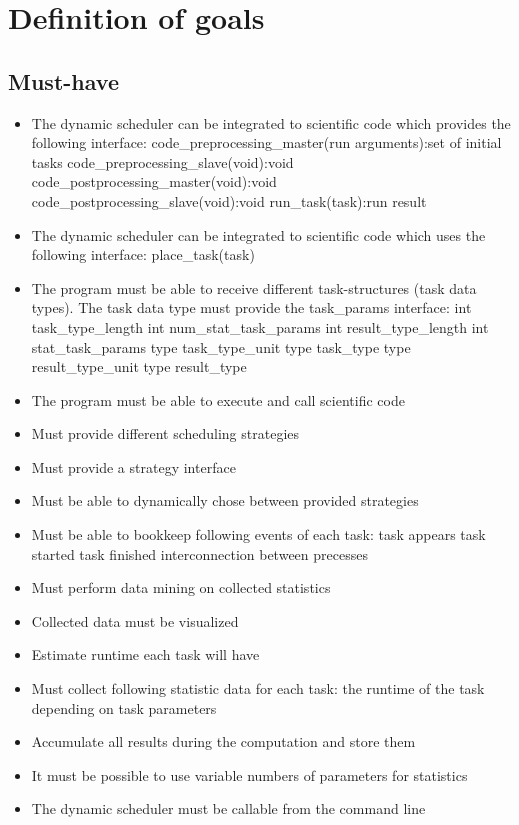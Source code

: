 \section{Definition of goals}
	\subsection{Must-have}
		\begin{itemize}
			\item The dynamic scheduler can be integrated to scientific code which provides the following interface:
				\subitem code\_preprocessing\_master(run arguments):set of initial tasks
				\subitem code\_preprocessing\_slave(void):void
				\subitem code\_postprocessing\_master(void):void
				\subitem code\_postprocessing\_slave(void):void
				\subitem run\_task(task):run result
			\item The dynamic scheduler can be integrated to scientific code which uses the following interface:
				\subitem place\_task(task)
			\item The program must be able to receive different task-structures (task data types). The task data type must provide the task\_params interface:
				\subitem int task\_type\_length
				\subitem int num\_stat\_task\_params
				\subitem int result\_type\_length
				\subitem int stat\_task\_params
				\subitem type task\_type\_unit
				\subitem type task\_type
				\subitem type result\_type\_unit
				\subitem type result\_type
				
			\item The program must be able to execute and call scientific code
			\item Must provide different scheduling strategies
			\item Must provide a strategy interface
			\item Must be able to dynamically chose between provided strategies
			\item Must be able to bookkeep following events of each task:
				\subitem task appears
				\subitem task started
				\subitem task finished
				\subitem interconnection between precesses
			\item Must perform data mining on collected statistics
			\item Collected data must be visualized
			\item Estimate runtime each task will have
			\item Must collect following statistic data for each task:
				\subitem the runtime of the task depending on task parameters
			\item Accumulate all results during the computation and store them
			\item It must be possible to use variable numbers of parameters for statistics
			\item The dynamic scheduler must be callable from the command line
		\end{itemize}
